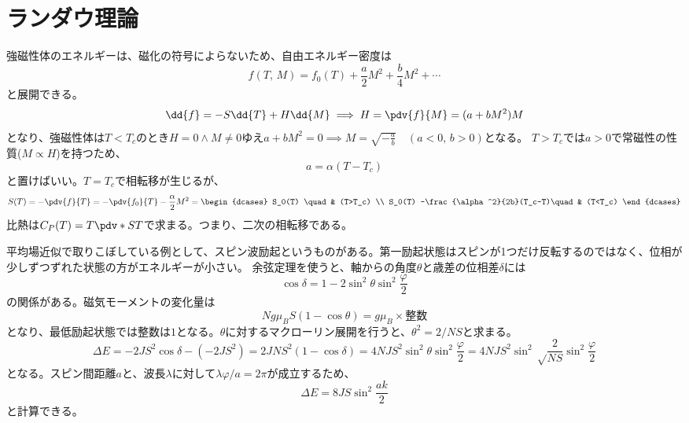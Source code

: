 \section{ランダウ理論}
強磁性体のエネルギーは、磁化の符号によらないため、自由エネルギー密度は
\begin{equation}
	f(T,\,M) = f_0(T) + \frac{a}{2}M^2 + \frac{b}{4}M^2+\cdots
\end{equation}
と展開できる。
\begin{equation}
	\dd{f} = -S\dd{T} + H\dd{M}\implies H = \pdv{f}{M} = (a+bM^2)M
\end{equation}
となり、強磁性体は$T<T_c$のとき$H=0\wedge{}M\neq 0$ゆえ$a+bM^2=0\implies M = \sqrt{-\frac{a}{b}}\quad(a<0,\,b>0)$となる。
$T>T_c$では$a>0$で常磁性の性質($M\propto{}H$)を持つため、
\begin{equation}
	a = \alpha(T-T_c)
\end{equation}
と置けばいい。$T=T_c$で相転移が生じるが、
\begin{equation}
	S(T) = -\pdv{f}{T} = -\pdv{f_0}{T} - \frac{\alpha}{2}M^2 =
	\begin{dcases}
		S_0(T) \quad                            & (T>T_c) \\
		S_0(T) -\frac{\alpha^2}{2b}(T_c-T)\quad & (T<T_c)
	\end{dcases}
\end{equation}
比熱は$C_P(T) = T\pdv*{S}{T}$で求まる。つまり、二次の相転移である。

平均場近似で取りこぼしている例として、スピン波励起というものがある。第一励起状態はスピンが1つだけ反転するのではなく、位相が少しずつずれた状態の方がエネルギーが小さい。
余弦定理を使うと、軸からの角度$\theta$と歳差の位相差$\delta$には
\begin{equation}
	\cos\delta = 1-2\sin^2\theta\sin^2\frac{\varphi}{2}
\end{equation}
の関係がある。磁気モーメントの変化量は
\begin{equation}
	Ng\mu_BS(1-\cos\theta) = g\mu_B\times{\text{整数}}
\end{equation}
となり、最低励起状態では整数は$1$となる。$\theta$に対するマクローリン展開を行うと、$\theta^2 = 2/NS$と求まる。
\begin{equation}
	\varDelta E = -2JS^2\cos\delta - (-2JS^2) = 2JNS^2(1-\cos\delta) = 4NJS^2\sin^2\theta\sin^2\frac{\varphi}{2} = 4NJS^2\sin^2\sqrt\frac{2}{NS}\sin^2\frac{\varphi}{2}
\end{equation}
となる。スピン間距離$a$と、波長$\lambda$に対して$\lambda\varphi/a = 2\pi$が成立するため、
\begin{equation}
	\varDelta E = 8JS\sin^2\frac{ak}{2}
\end{equation}
と計算できる。
